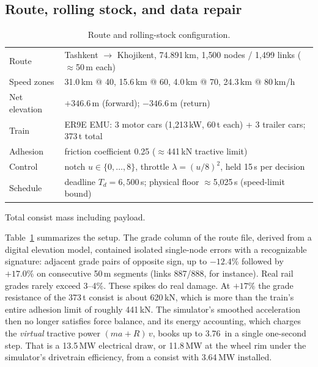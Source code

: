 \documentclass[11pt,a4paper]{article}
\newcommand{\kwh}{\,\text{kWh}}   %
\begin{document}
\subsection{Route, rolling stock, and data repair}
\label{sec:data}

\begin{table}[t]
\centering\small
\begin{threeparttable}
\caption{Route and rolling-stock configuration.}
\label{tab:setup}
\begin{tabular}{ll}
\toprule
Route & Tashkent $\rightarrow$ Khojikent, 74.891\,km, 1{,}500 nodes / 1{,}499 links ($\approx$50\,m each) \\
Speed zones & 31.0\,km @ 40, 15.6\,km @ 60, 4.0\,km @ 70, 24.3\,km @ 80\,km/h \\
Net elevation & $+346.6$\,m (forward); $-346.6$\,m (return) \\
Train & ER9E EMU: 3 motor cars (1{,}213\,kW, 60\,t each) + 3 trailer cars; 373\,t total\tnote{a} \\
Adhesion & friction coefficient 0.25 ($\approx$441\,kN tractive limit) \\
Control & notch $u \in \{0,\dots,8\}$, throttle $\lambda=(u/8)^2$, held 15\,s per decision \\
Schedule & deadline $T_d = 6{,}500$\,s; physical floor $\approx$5{,}025\,s (speed-limit bound) \\
\bottomrule
\end{tabular}
\begin{tablenotes}\footnotesize
\item[a] Total consist mass including payload.
\end{tablenotes}
\end{threeparttable}
\end{table}

Table~\ref{tab:setup} summarizes the setup. The grade column of the route
file, derived from a digital elevation model, contained isolated
single-node errors with a recognizable signature: adjacent grade pairs of
opposite sign, up to $-12.4\%$ followed by $+17.0\%$ on consecutive 50\,m
segments (links 887/888, for instance). Real rail grades rarely exceed
3--4\%. These spikes do real damage. At $+17\%$ the grade resistance of
the 373\,t consist is about 620\,kN, which is more than the train's
entire adhesion limit of roughly 441\,kN. The simulator's smoothed
acceleration then no longer satisfies force balance, and its energy
accounting, which charges the \emph{virtual} tractive power $(m a +
R)\,v$, books up to 3.76\kwh{} in a single one-second step. That is a
13.5\,MW electrical draw, or 11.8\,MW at the wheel rim under the
simulator's drivetrain efficiency, from a consist with 3.64\,MW
installed.
\end{document}
